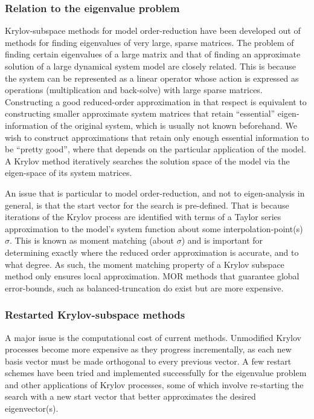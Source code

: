 \subsubsection{Relation to the eigenvalue problem}
Krylov-subspace methods for model order-reduction have been developed out of methods for finding eigenvalues of very large, sparse matrices.   The problem of finding certain eigenvalues of a large matrix and that of finding an approximate solution of a large dynamical system model are closely related.   This is because the system can be represented as a linear operator whose action is expressed as operations (multiplication and back-solve) with large sparse matrices.    Constructing a good reduced-order approximation in that respect is equivalent to constructing smaller approximate system matrices that retain ``essential'' eigen-information of the original system, which is usually not known beforehand.  We wish to construct approximations that retain only enough essential information to be ``pretty good'', where that depends on the particular application of the model.    A Krylov method iteratively searches the solution space of the model via the eigen-space of its system matrices.


An issue that is particular to model order-reduction, and not to eigen-analysis in general, is that the start vector for the search is pre-defined.  That is because iterations of the Krylov process are identified with terms of a Taylor series approximation to the model's system function about some interpolation-point(s) $\sigma$.   This is known as moment matching (about $\sigma$) and is important for determining exactly where the reduced order approximation is accurate, and to what degree.  As such, the moment matching property of a  Krylov subspace method only ensures local approximation.  MOR methods that guarantee global error-bounds, such as balanced-truncation \cite{moore1981principal} do exist but are more expensive. 


\subsubsection{Restarted Krylov-subspace methods}
A major issue is the computational cost of current methods.   Unmodified Krylov processes become more expensive as they progress incrementally, as each new basis vector must be made orthogonal to every previous vector.   A few restart schemes have been tried and implemented successfully for the eigenvalue problem and other applications of Krylov processes, some of which involve re-starting the search with a new start vector that better approximates the desired eigenvector(s).


